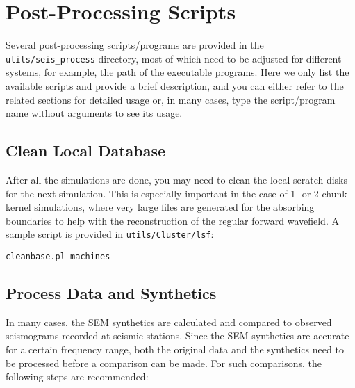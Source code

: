 \chapter{Post-Processing Scripts}

Several post-processing scripts/programs are provided in the \texttt{utils/seis\_process}
directory, most of which need to be adjusted for different
systems, for example, the path of the executable programs. Here we
only list the available scripts and provide a brief description, and
you can either refer to the related sections for detailed usage or,
in many cases, type the script/program name without arguments
to see its usage.


\section{Clean Local Database}

After all the simulations are done, you may need to clean the local
scratch disks for the next simulation. This is especially important
in the case of 1- or 2-chunk kernel simulations, where very large files
are generated for the absorbing boundaries to help with the reconstruction
of the regular forward wavefield. A sample script is provided in \texttt{utils/Cluster/lsf}:
\begin{verbatim}
cleanbase.pl machines
\end{verbatim}

\section{Process Data and Synthetics}\label{sec:Process-data-and-syn}

In many cases, the SEM synthetics are calculated and compared to observed
seismograms recorded at seismic stations. Since the SEM synthetics
are accurate for a certain frequency range, both the original data
and the synthetics need to be processed before a comparison can be
made. For such comparisons, the following steps are recommended:

